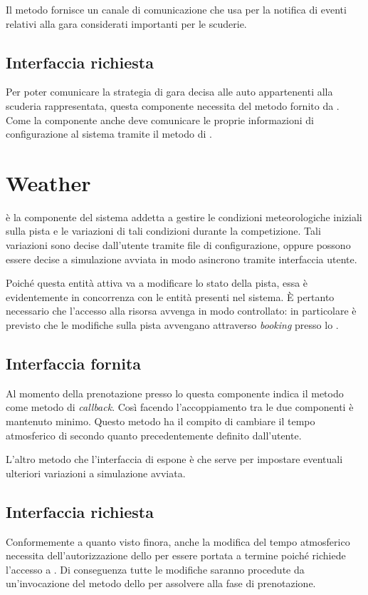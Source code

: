 Il metodo  fornisce un canale di comunicazione che \evdisp{} usa per la notifica di eventi relativi alla gara considerati importanti per le scuderie.

\subsection*{Interfaccia richiesta}
Per poter comunicare la strategia di gara decisa alle auto appartenenti alla scuderia rappresentata, questa componente necessita del metodo  fornito da \car{}.
Come la componente \car{} anche \team{} deve comunicare le proprie informazioni di configurazione al sistema tramite il metodo  di \evdisp{}.

\section{Weather}
\weather{} è la componente del sistema addetta a gestire le condizioni meteorologiche iniziali sulla pista e le variazioni di tali condizioni durante la competizione. Tali variazioni sono decise dall'utente tramite file di configurazione, oppure possono essere decise a simulazione avviata in modo asincrono tramite interfaccia utente.

Poiché questa entità attiva va a modificare lo stato della pista, essa è evidentemente in concorrenza con le entità \car{} presenti nel sistema. \`E pertanto necessario che l'accesso alla risorsa \track{} avvenga in modo controllato: in particolare è previsto che le modifiche sulla pista avvengano attraverso \textit{booking} presso lo \sched{}.

\subsection*{Interfaccia fornita}
Al momento della prenotazione presso lo \sched{} questa componente indica il metodo  come metodo di \textit{callback}. Così facendo l'accoppiamento tra le due componenti è mantenuto minimo. Questo metodo ha il compito di cambiare il tempo atmosferico di \track{} secondo quanto precedentemente definito dall'utente.

L'altro metodo che l'interfaccia di \weather{} espone è  che serve per impostare eventuali ulteriori variazioni a simulazione avviata.

\subsection*{Interfaccia richiesta}
Conformemente a quanto visto finora, anche la modifica del tempo atmosferico necessita dell'autorizzazione dello \sched{} per essere portata a termine poiché richiede l'accesso a \track{}. Di conseguenza tutte le modifiche saranno procedute da un'invocazione del metodo  dello \sched{} per assolvere alla fase di prenotazione.

